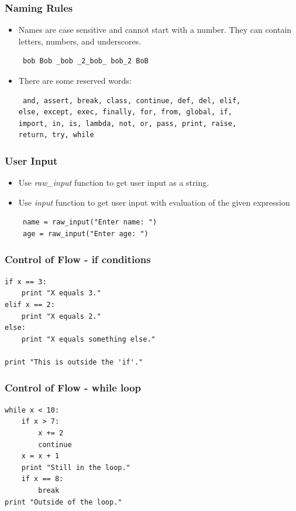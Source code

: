 \documentclass[12pt,handout]{beamer}
\begin{document}
\begin{frame}[fragile]
\frametitle{Naming Rules}

\begin{itemize}
\item Names are case sensitive and cannot start with a number.
They can contain letters, numbers, and underscores.\\
\small{
\begin{verbatim}
 bob Bob _bob _2_bob_ bob_2 BoB
\end{verbatim}
}
\item There are some reserved words:\\
\small{
\begin{verbatim}
 and, assert, break, class, continue, def, del, elif,
else, except, exec, finally, for, from, global, if,
import, in, is, lambda, not, or, pass, print, raise,
return, try, while
\end{verbatim}
}
\end{itemize}
\end{frame}

\begin{frame}[fragile]
\frametitle{User Input}

\begin{itemize}
\item Use {\it raw\_input} function to get user input as a string.
\item Use {\it input} function to get user input with evaluation
of the given expression
\small{
\begin{verbatim}
 name = raw_input("Enter name: ")
 age = raw_input("Enter age: ")
\end{verbatim}
}
\end{itemize}
\end{frame}

\begin{frame}[fragile]
\frametitle{Control of Flow - if conditions}
\small{
\begin{verbatim}
if x == 3:
    print "X equals 3."
elif x == 2:
    print "X equals 2."
else:
    print "X equals something else."

print "This is outside the 'if'."

\end{verbatim}
}
\end{frame}

\begin{frame}[fragile]
\frametitle{Control of Flow - while loop}
\small{
\begin{verbatim}
while x < 10:
    if x > 7:
        x += 2
        continue
    x = x + 1
    print "Still in the loop."
    if x == 8:
        break
print "Outside of the loop."
\end{verbatim}
}
\end{frame}
\end{document}
